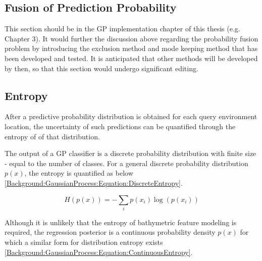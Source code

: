 		\subsection{Fusion of Prediction Probability}

			{\color{BurntOrange} This section should be in the GP implementation chapter of this thesis (e.g. Chapter 3). It would further the discussion above regarding the probability fusion problem by introducing the exclusion method and mode keeping method that has been developed and tested. It is anticipated that other methods will be developed by then, so that this section would undergo significant editing.}
			
			
			
%							
%				
	
		\subsection{Entropy}
		
			After a predictive probability distribution is obtained for each query environment location, the uncertainty of such predictions can be quantified through the entropy of of that distribution.
			
			The output of a GP classifier is a discrete probability distribution with finite size - equal to the number of classes. For a general discrete probability distribution $p(x)$, the entropy is quantified as below \eqref{Background:GaussianProcess:Equation:DiscreteEntropy}.
			
			\begin{equation}
				H(p(x)) = - \sum_{i} p(x_{i}) \log(p(x_{i}))
			\label{Background:GaussianProcess:Equation:DiscreteEntropy}
			\end{equation}
			
			Although it is unlikely that the entropy of bathymetric feature modeling is required, the regression posterior is a continuous probability density $p(x)$ for which a similar form for distribution entropy exists \eqref{Background:GaussianProcess:Equation:ContinuousEntropy}.
			
